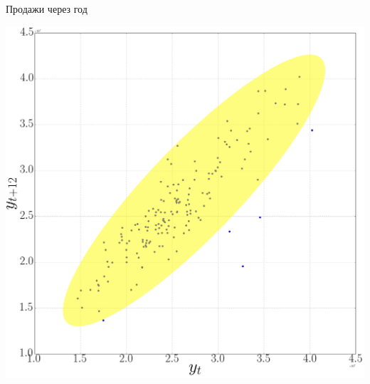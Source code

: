\documentclass[9pt,pdf,utf8,hyperref={unicode},aspectratio=169]{beamer}
\begin{document}
\begin{frame}{Продажи через год}
	\begin{center}
		\includegraphics[height=0.6\textheight]{wine9.png}
	\end{center}
\end{frame}
\end{document}
